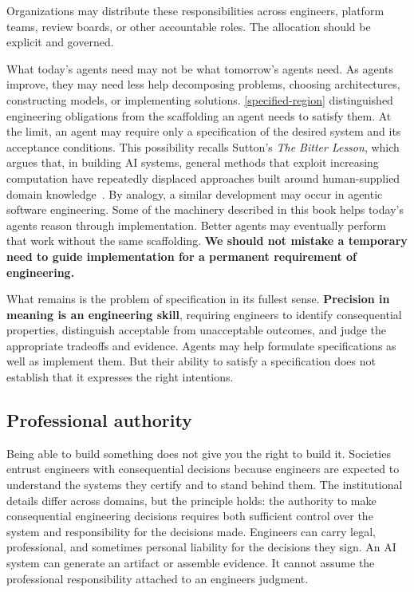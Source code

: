 
Organizations may distribute these responsibilities across engineers, platform teams, review boards, or other accountable roles. The allocation should be explicit and governed.

What today's agents need may not be what tomorrow's agents need. As agents improve, they may need less help decomposing problems, choosing architectures, constructing models, or implementing solutions. \autoref{specified-region} distinguished engineering obligations from the scaffolding an agent needs to satisfy them. At the limit, an agent may require only a specification of the desired system and its acceptance conditions. This possibility recalls Sutton's \emph{The Bitter Lesson}, which argues that, in building AI systems, general methods that exploit increasing computation have repeatedly displaced approaches built around human-supplied domain knowledge~\citep{sutton2019bitterlesson}. By analogy, a similar development may occur in agentic software engineering. Some of the machinery described in this book helps today's agents reason through implementation. Better agents may eventually perform that work without the same scaffolding. \textbf{We should not mistake a temporary need to guide implementation for a permanent requirement of engineering.}

What remains is the problem of specification in its fullest sense. \textbf{Precision in meaning is an engineering skill}, requiring engineers to identify consequential properties, distinguish acceptable from unacceptable outcomes, and judge the appropriate tradeoffs and evidence. Agents may help formulate specifications as well as implement them. But their ability to satisfy a specification does not establish that it expresses the right intentions.

\subsection{Professional authority}\label{heading:professional-authority}


Being able to build something does not give you the right to build it. Societies entrust engineers with consequential decisions because engineers are expected to understand the systems they certify and to stand behind them. The institutional details differ across domains, but the principle holds: the authority to make consequential engineering decisions requires both sufficient control over the system and responsibility for the decisions made. Engineers can carry legal, professional, and sometimes personal liability for the decisions they sign. An AI system can generate an artifact or assemble evidence. It cannot assume the professional responsibility attached to an engineer\textquotesingle s judgment.

